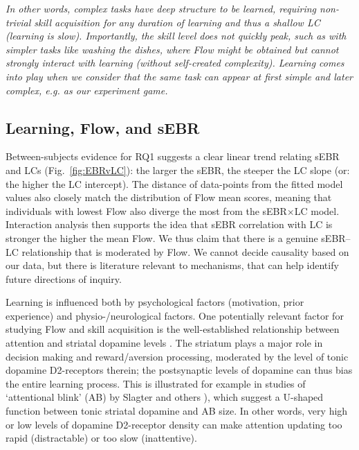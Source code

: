 \documentclass[a4paper,doc,floatsintext,natbib,10pt]{apa6}
\begin{document}
{\it In other words, complex tasks have deep structure to be learned, requiring non-trivial skill acquisition for any duration of learning and thus a shallow LC (learning is slow). Importantly, the skill level does not quickly peak, such as with simpler tasks like washing the dishes, where Flow might be obtained but cannot strongly interact with learning (without self-created complexity). Learning comes into play when we consider that the same task can appear at first simple and later complex, e.g. as our experiment game.}

\subsection*{Learning, Flow, and sEBR}
Between-subjects evidence for RQ1 suggests a clear linear trend relating sEBR and LCs (Fig.~\ref{fig:EBRvLC}): the larger the sEBR, the steeper the LC slope (or: the higher the LC intercept). The distance of data-points from the fitted model values also closely match the distribution of Flow mean scores, meaning that individuals with lowest Flow also diverge the most from the sEBR$\times$LC model. Interaction analysis then supports the idea that sEBR correlation with LC is stronger the higher the mean Flow. We thus claim that there is a genuine sEBR--LC relationship that is moderated by Flow. We cannot decide causality based on our data, but there is literature relevant to mechanisms, that can help identify future directions of inquiry.

Learning is influenced both by psychological factors (motivation, prior experience) and physio-/neurological factors. One potentially relevant factor for studying Flow and skill acquisition is the well-established relationship between attention and striatal dopamine levels \citep{Dreisbach2005}. The striatum plays a major role in decision making and reward/aversion processing, moderated by the level of tonic dopamine D2-receptors therein; the postsynaptic levels of dopamine can thus bias the entire learning process. This is illustrated for example in studies of `attentional blink' (AB) by Slagter and others \citep{Slagter2012,COLZATO2008}), which suggest a U-shaped function between tonic striatal dopamine and AB size. In other words, very high or low levels of dopamine D2-receptor density can make attention updating too rapid (distractable) or too slow (inattentive).
\end{document}
